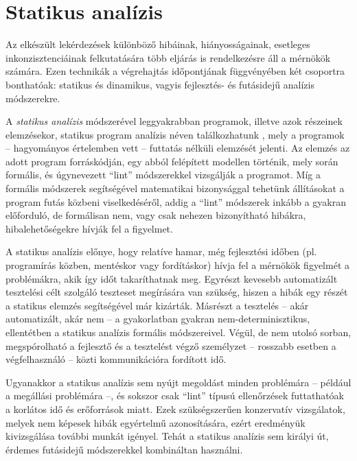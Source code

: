 
\section{Statikus analízis}

Az elkészült lekérdezések különböző hibáinak, hiányosságainak, esetleges inkonzisztenciáinak felkutatására több eljárás is rendelkezésre áll a mérnökök számára.
Ezen technikák a végrehajtás időpontjának függvényében két csoportra bonthatóak: statikus és dinamikus, vagyis fejlesztés- és futásidejű analízis módszerekre.

A \emph{statikus analízis} módszerével leggyakrabban programok, illetve azok részeinek elemzésekor, statikus program analízis néven találkozhatunk \cite{wiki:StaticProgramAnalysis}, mely a programok -- hagyományos értelemben vett -- futtatás nélküli elemzését jelenti.
Az elemzés az adott program forráskódján, egy abból felépített modellen történik, mely során formális, és úgynevezett ``lint'' módszerekkel vizsgálják a programot.
Míg a formális módszerek segítségével matematikai bizonysággal tehetünk állításokat a program futás közbeni viselkedéséről, addig a ``lint'' módszerek inkább a gyakran előforduló, de formálisan nem, vagy csak nehezen bizonyítható hibákra, hibalehetőségekre hívják fel a figyelmet. 

A statikus analízis előnye, hogy relatíve hamar, még fejlesztési időben (pl. programírás közben, mentéskor vagy fordításkor) hívja fel a mérnökök figyelmét a problémákra, akik így időt takaríthatnak meg. Egyrészt kevesebb automatizált tesztelési célt szolgáló teszteset megírására van szükség, hiszen a hibák egy részét a statikus elemzés segítségével már kizárták. Másrészt a tesztelés -- akár automatizált, akár nem -- a gyakorlatban gyakran nem-determinisztikus, ellentétben a statikus analízis formális módszereivel. Végül, de nem utolsó sorban, megspórolható a fejlesztő és a tesztelést végző személyzet -- rosszabb esetben a végfelhasználó -- közti kommunikációra fordított idő.

Ugyanakkor a statikus analízis sem nyújt megoldást minden problémára -- például a megállási problémára \cite{wiki:HaltingProblem} --, és sokszor csak ``lint'' típusú ellenőrzések futtathatóak a korlátos idő és erőforrások miatt. Ezek szükségszerűen konzervatív vizsgálatok, melyek nem képesek hibák egyértelmű azonosítására, ezért eredményük kivizsgálása további munkát igényel. Tehát a statikus analízis sem királyi út, érdemes futásidejű módszerekkel kombináltan használni.

